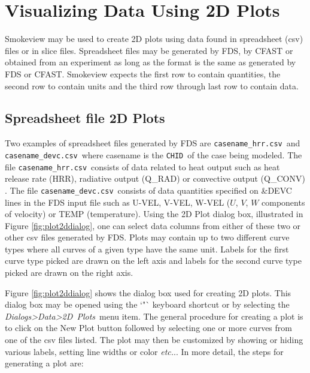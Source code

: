 \documentclass[11pt,twoside]{book}
\begin{document}

\chapter{Visualizing Data Using 2D Plots}
\label{chap:2DPLOT}

Smokeview may be used to create 2D plots using data found in spreadsheet (csv) files
or in slice files.
Spreadsheet files may be generated by FDS, by CFAST or  obtained from an experiment as long as the
format is the same as generated by FDS or CFAST.  Smokeview expects the first row to
contain quantities, the second row to contain units and the third row through last row to
contain data.
\section{Spreadsheet file 2D Plots}
Two examples of spreadsheet files generated by FDS are
{\tt casename\_hrr.csv}\ and {\tt casename\_devc.csv}\ where casename is the
{\tt CHID}\ of the case being modeled.
The file {\tt casename\_hrr.csv}\ consists of data related
to heat output such as heat release rate (HRR),
radiative output (Q\_RAD) or convective output
(Q\_CONV) .  The file {\tt casename\_devc.csv}\ consists of data quantities specified on \&DEVC lines
in the FDS input file
such as U-VEL, V-VEL, W-VEL ($U$, $V$, $W$ components of velocity) or TEMP (temperature).
Using the 2D Plot dialog box, illustrated in Figure \ref{fig:plot2ddialog},
one can select data columns from either of these two or other csv files
generated by FDS. Plots may contain up to two different curve types
where all curves of a given type have the same unit.
Labels for the first curve type picked are drawn on the left axis
and labels for the second curve type picked are drawn on the right axis.

Figure \ref{fig:plot2ddialog}
shows the dialog box used for creating 2D plots.  This dialog box may be opened using the `"` keyboard
shortcut or by selecting the {\em Dialogs>Data>2D~Plots}\ menu item.
The general procedure for creating a plot is to
click on the New Plot button followed by selecting one or more curves from one of the csv files listed.
The plot may
then be customized by showing or hiding various labels, setting line widths or color {\em etc.}..  In more detail,
the steps for generating a plot are:
\end{document}
